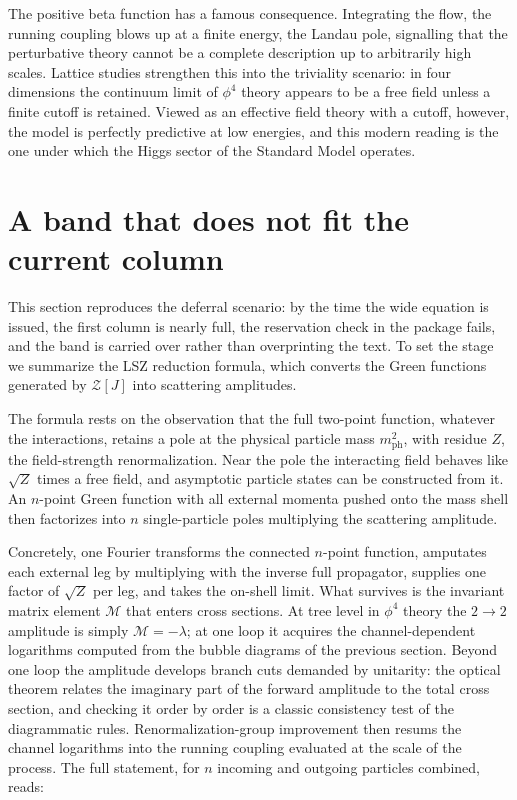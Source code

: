 \documentclass[twocolumn]{article}
\begin{document}
The positive beta function has a famous consequence. Integrating the
flow, the running coupling blows up at a finite energy, the Landau pole,
signalling that the perturbative theory cannot be a complete description
up to arbitrarily high scales. Lattice studies strengthen this into the
triviality scenario: in four dimensions the continuum limit of $\phi^4$
theory appears to be a free field unless a finite cutoff is retained.
Viewed as an effective field theory with a cutoff, however, the model is
perfectly predictive at low energies, and this modern reading is the one
under which the Higgs sector of the Standard Model operates.

\clearpage
\section{A band that does not fit the current column}

This section reproduces the deferral scenario: by the time the wide
equation is issued, the first column is nearly full, the reservation
check in the package fails, and the band is carried over rather than
overprinting the text. To set the stage we summarize the LSZ reduction
formula, which converts the Green functions generated by
$\mathcal{Z}[J]$ into scattering amplitudes.

The formula rests on the observation that the full two-point function,
whatever the interactions, retains a pole at the physical particle mass
$m_{\mathrm{ph}}^2$, with residue $Z$, the field-strength renormalization.
Near the pole the interacting field behaves like $\sqrt{Z}$ times a free
field, and asymptotic particle states can be constructed from it. An
$n$-point Green function with all external momenta pushed onto the mass
shell then factorizes into $n$ single-particle poles multiplying the
scattering amplitude.

Concretely, one Fourier transforms the connected $n$-point function,
amputates each external leg by multiplying with the inverse full
propagator, supplies one factor of $\sqrt{Z}$ per leg, and takes the
on-shell limit. What survives is the invariant matrix element
$\mathcal{M}$ that enters cross sections. At tree level in $\phi^4$
theory the $2\to2$ amplitude is simply $\mathcal{M} = -\lambda$; at one
loop it acquires the channel-dependent logarithms computed from the
bubble diagrams of the previous section. Beyond one loop the amplitude
develops branch cuts demanded by unitarity: the optical theorem relates
the imaginary part of the forward amplitude to the total cross section,
and checking it order by order is a classic consistency test of the
diagrammatic rules. Renormalization-group improvement then resums the
channel logarithms into the running coupling evaluated at the scale of
the process. The full statement, for $n$
incoming and outgoing particles combined, reads:
\end{document}
